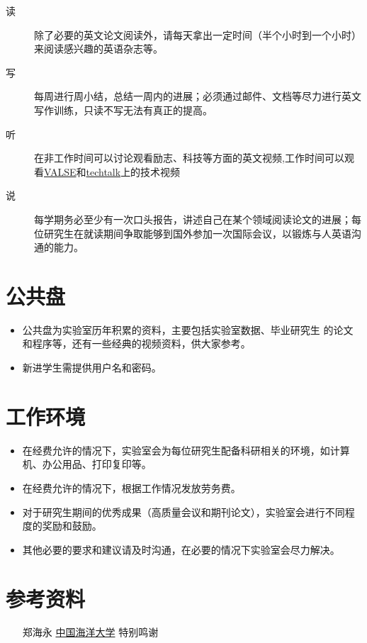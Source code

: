 \documentclass[a4paper，12pt]{article}
\begin{document}
\begin{description}

\item[读] 除了必要的英文论文阅读外，请每天拿出一定时间（半个小时到一个小时）来阅读感兴趣的英语杂志等。

\item[写] 每周进行周小结，总结一周内的进展；必须通过邮件、文档等尽力进行英文写作训练，只读不写无法有真正的提高。

\item[听] 在非工作时间可以讨论观看励志、科技等方面的英文视频,工作时间可以观看\href{http://vision.ouc.edu.cn/valse/}{VALSE}和\href{http://techtalks.tv/}{techtalk}上的技术视频

\item[说] 每学期务必至少有一次口头报告，讲述自己在某个领域阅读论文的进展；每位研究生在就读期间争取能够到国外参加一次国际会议，以锻炼与人英语沟通的能力。

\end{description}

\section{公共盘}

\begin{itemize}

\item 公共盘为实验室历年积累的资料，主要包括实验室数据、毕业研究生
的论文和程序等，还有一些经典的视频资料，供大家参考。

\item 新进学生需提供用户名和密码。

\end{itemize}

\section{工作环境}

\begin{itemize}

\item 在经费允许的情况下，实验室会为每位研究生配备科研相关的环境，如计算机、办公用品、打印复印等。

\item 在经费允许的情况下，根据工作情况发放劳务费。

\item 对于研究生期间的优秀成果（高质量会议和期刊论文），实验室会进行不同程度的奖励和鼓励。

\item 其他必要的要求和建议请及时沟通，在必要的情况下实验室会尽力解决。

\end{itemize}

\section{参考资料}

\begin{itemize}
\item[郑海永]\href{http://vision.ouc.edu.cn/~zhenghaiyong/}{中国海洋大学} 特别鸣谢
\end{itemize}
\end{document}
